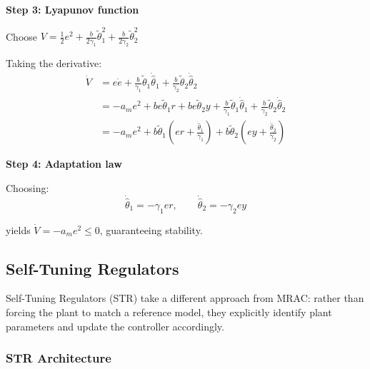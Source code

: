 \textbf{Step 3: Lyapunov function}

Choose $V = \frac{1}{2}e^2 + \frac{b}{2\gamma_1}\tilde{\theta}_1^2 + \frac{b}{2\gamma_2}\tilde{\theta}_2^2$

Taking the derivative:
\begin{align}
\dot{V} &= e\dot{e} + \frac{b}{\gamma_1}\tilde{\theta}_1\dot{\hat{\theta}}_1 + \frac{b}{\gamma_2}\tilde{\theta}_2\dot{\hat{\theta}}_2 \nonumber \\
&= -a_m e^2 + be\tilde{\theta}_1 r + be\tilde{\theta}_2 y + \frac{b}{\gamma_1}\tilde{\theta}_1\dot{\hat{\theta}}_1 + \frac{b}{\gamma_2}\tilde{\theta}_2\dot{\hat{\theta}}_2 \nonumber \\
&= -a_m e^2 + b\tilde{\theta}_1\left(er + \frac{\dot{\hat{\theta}}_1}{\gamma_1}\right) + b\tilde{\theta}_2\left(ey + \frac{\dot{\hat{\theta}}_2}{\gamma_2}\right)
\end{align}

\textbf{Step 4: Adaptation law}

Choosing:
\begin{equation}
\dot{\hat{\theta}}_1 = -\gamma_1 e r, \qquad \dot{\hat{\theta}}_2 = -\gamma_2 e y
\end{equation}

yields $\dot{V} = -a_m e^2 \leq 0$, guaranteeing stability.

\subsection{Self-Tuning Regulators}

Self-Tuning Regulators (STR) take a different approach from MRAC: rather than forcing the plant to match a reference model, they explicitly identify plant parameters and update the controller accordingly.

\subsubsection{STR Architecture}

